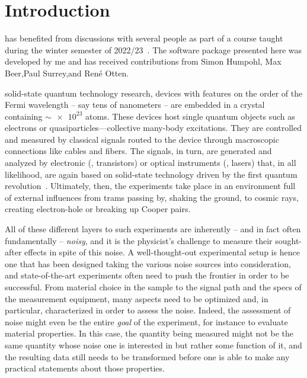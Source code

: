 \chapter{Introduction}\label{ch:speck:introduction}

\begin{partcontribs}
    \Thispart has benefited from discussions with several people as part of a course taught during the winter semester of 2022/23~.
    The software package presented here was developed by me and has received contributions from Simon Humpohl,\sidenote[a]{\RWTHFZJ}
    Max Beer,\sidenotemark[a] Paul Surrey,\sidenotemark[a] and René Otten.
\end{partcontribs}

 solid-state quantum technology research, devices with features on the order of the Fermi wavelength -- say tens of nanometers -- are embedded in a crystal containing $\sim\num{e23}$ atoms.
These devices host single quantum objects such as electrons or quasiparticles---collective many-body excitations.
They are controlled and measured by classical signals routed to the device through macroscopic connections like cables and fibers.
The signals, in turn, are generated and analyzed by electronic (\eg, transistors) or optical instruments (\eg, lasers) that, in all likelihood, are again based on solid-state technology driven by the first quantum revolution~\cite{Dowling2003,Aspect2024}.
Ultimately, then, the experiments take place in an environment full of external influences from trams passing by, shaking the ground, to cosmic rays, creating electron-hole or breaking up Cooper pairs.

All of these different layers to such experiments are inherently -- and in fact often fundamentally
-- \emph{noisy}, and it is the physicist's challenge to measure their sought-after effects in spite of this noise.
A well-thought-out experimental setup is hence one that has been designed taking the various noise sources into consideration, and state\hyp{}of\hyp{}the\hyp{}art experiments often need to push the frontier in order to be successful.
From material choice in the sample to the signal path and the specs of the measurement equipment, many aspects need to be optimized and, in particular, characterized in order to assess the noise.
Indeed, the assessment of noise might even be the entire \emph{goal} of the experiment, for instance to evaluate material properties.
In this case, the quantity being measured might not be the same quantity whose noise one is interested in but rather some function of it, and the resulting data still needs to be transformed before one is able to make any practical statements about those properties.

